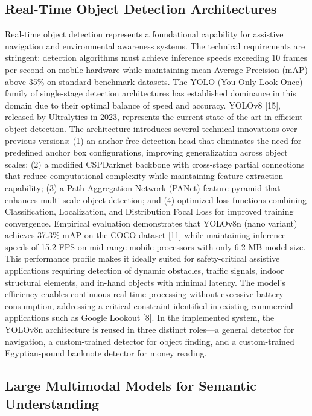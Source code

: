 \documentclass[a4paper]{report}
\begin{document}
\subsection{Real-Time Object Detection Architectures}

Real-time object detection represents a foundational capability for assistive navigation and environmental awareness systems. The technical requirements are stringent: detection algorithms must achieve inference speeds exceeding 10 frames per second on mobile hardware while maintaining mean Average Precision (mAP) above 35\% on standard benchmark datasets. The YOLO (You Only Look Once) family of single-stage detection architectures has established dominance in this domain due to their optimal balance of speed and accuracy. YOLOv8 [15], released by Ultralytics in 2023, represents the current state-of-the-art in efficient object detection. The architecture introduces several technical innovations over previous versions: (1) an anchor-free detection head that eliminates the need for predefined anchor box configurations, improving generalization across object scales; (2) a modified CSPDarknet backbone with cross-stage partial connections that reduce computational complexity while maintaining feature extraction capability; (3) a Path Aggregation Network (PANet) feature pyramid that enhances multi-scale object detection; and (4) optimized loss functions combining Classification, Localization, and Distribution Focal Loss for improved training convergence. Empirical evaluation demonstrates that YOLOv8n (nano variant) achieves 37.3\% mAP on the COCO dataset [11] while maintaining inference speeds of 15.2 FPS on mid-range mobile processors with only 6.2 MB model size. This performance profile makes it ideally suited for safety-critical assistive applications requiring detection of dynamic obstacles, traffic signals, indoor structural elements, and in-hand objects with minimal latency. The model's efficiency enables continuous real-time processing without excessive battery consumption, addressing a critical constraint identified in existing commercial applications such as Google Lookout [8]. In the implemented system, the YOLOv8n architecture is reused in three distinct roles---a general detector for navigation, a custom-trained detector for object finding, and a custom-trained Egyptian-pound banknote detector for money reading.

\subsection{Large Multimodal Models for Semantic Understanding}
\end{document}
